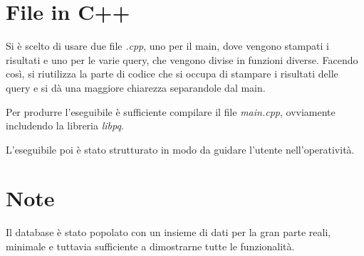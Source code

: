 \documentclass[10pt]{article}
\newcommand{\spazia}{\par\medskip}
\begin{document}
\section{File in C++}

Si è scelto di usare due file \textit{.cpp}, uno per il main, dove vengono stampati i risultati e uno per le varie query, che vengono divise in funzioni diverse. Facendo così, si riutilizza la parte di codice che si occupa di stampare i risultati delle query e si dà una maggiore chiarezza separandole dal main.\spazia

Per produrre l'eseguibile è sufficiente compilare il file \textit{main.cpp}, ovviamente includendo la libreria \textit{libpq}.

L'eseguibile poi è stato strutturato in modo da guidare l'utente nell'operatività.

\section{Note}
Il database è stato popolato con un insieme di dati per la gran parte reali, minimale e tuttavia sufficiente a dimostrarne tutte le funzionalità.
\end{document}
